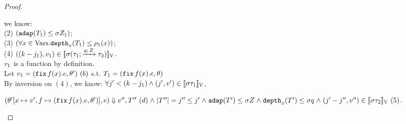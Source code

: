 \begin{proof}
\begin{mainitem}
%
we know: \\
(2) $(\mathtt{adap}(T_1) \leq \sigma Z_1)$;\\
%
(3) $ (\forall x \in \mbox{Vars}. \mathtt{depth}_{x}(T_1) \leq \rho_1(x))$;\\
%
(4) $((k - j_1), v_1) \in [\![  \sigma
  (\tau_1;   \xrightarrow{ q ; \, Z} \tau_2)  ]\!]_{\text{V}}$.\\
%
$v_1$ is a function by definition.\\
%
Let $v_1 = (\mathop{\mathtt{fix}} f(x). e, \theta') ~(b)$ s.t. $T_1= (\mathop{\mathtt{fix}}
f(x). e, \theta)$\\
%
By inversion on $(4)$, we know: $\forall j' < (k - j_1) \land (j', v') \in [\![ \sigma \tau_1 ]\!]_{\text{V}}$,
%

 $   (\theta'[x \mapsto v', f \mapsto (\mathop{\mathtt{fix}} f(x).e, \theta')],
 e) \mathrel{\Downarrow} v'', T''~(d) \mathrel{\wedge} |T''| = j'' \leq j'
 \mathrel{\wedge} \mathtt{adap}(T') \leq \sigma Z  \mathrel{\wedge} \mathtt{depth}_{x}(T') \leq \sigma
 q \mathrel{\wedge}    (j'-j'', v'') \in [\![ \sigma \tau_2 ]\!]_{\text{V}} ~ (5)$.\\ 
%


\end{mainitem}
\end{proof}

